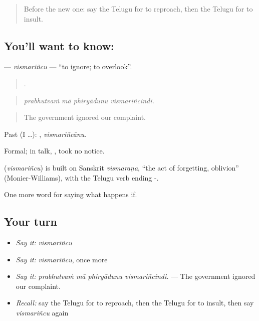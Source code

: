 \label{lesson:TE-C428-vismarincu}



\begin{quote}
Before the new one: say the Telugu for to reproach, then the Telugu for to insult.
\end{quote}

\subsection*{You'll want to know: }
\textbf{} — \emph{vismariñcu} — \textquotedblleft{}to ignore; to overlook\textquotedblright{}.

\begin{quote}
   .
\end{quote}

\begin{quote}
\emph{prabhutvaṁ mā phiryādunu vismariñcindi.}
\end{quote}

\begin{quote}
The government ignored our complaint.
\end{quote}

Past (I …): , \emph{vismariñcānu}.

Formal; in talk, , took no notice.

\begin{cousinweb}
\textbf{} (\emph{vismariñcu}) is built on Sanskrit \emph{vismaraṇa}, \textquotedblleft{}the act of forgetting, oblivion\textquotedblright{} (Monier-Williams), with the Telugu verb ending -.
\end{cousinweb}

\begin{grammarlens}[title={What you've built}]
One more word for saying what happens if.
\end{grammarlens}

\subsection*{Your turn}
\begin{itemize}
\raggedright
  \item \emph{Say it:} \emph{vismariñcu}
  \item \emph{Say it:} \emph{vismariñcu}, once more
  \item \emph{Say it:} \emph{prabhutvaṁ mā phiryādunu vismariñcindi.} — The government ignored our complaint.
  \item \emph{Recall:} say the Telugu for to reproach, then the Telugu for to insult, then say \emph{vismariñcu} again
\end{itemize}

